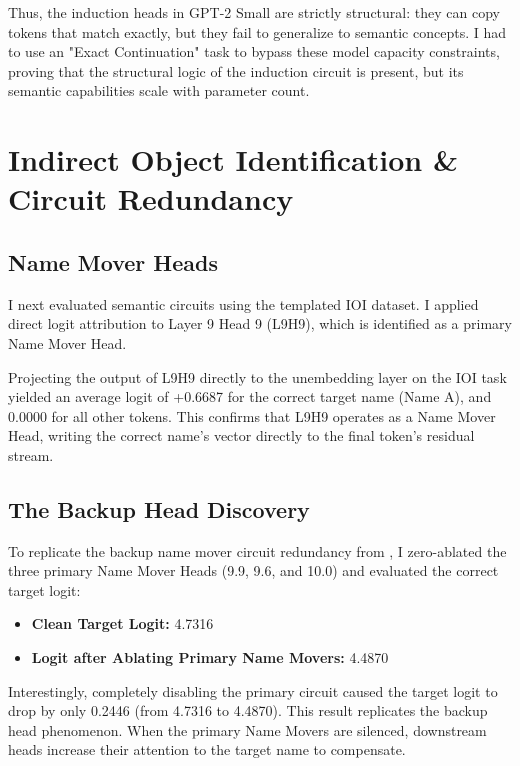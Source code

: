 \documentclass[11pt]{article}
\begin{document}
Thus, the induction heads in GPT-2 Small are strictly structural: they can copy tokens that match exactly, but they fail to generalize to semantic concepts. I had to use an "Exact Continuation" task to bypass these model capacity constraints, proving that the structural logic of the induction circuit is present, but its semantic capabilities scale with parameter count.

\section{Indirect Object Identification \& Circuit Redundancy}

\subsection{Name Mover Heads}

I next evaluated semantic circuits using the templated IOI dataset. I applied direct logit attribution to Layer 9 Head 9 (L9H9), which is identified as a primary Name Mover Head. 

Projecting the output of L9H9 directly to the unembedding layer on the IOI task yielded an average logit of +0.6687 for the correct target name (Name A), and 0.0000 for all other tokens. This confirms that L9H9 operates as a Name Mover Head, writing the correct name's vector directly to the final token's residual stream.

\subsection{The Backup Head Discovery}

To replicate the backup name mover circuit redundancy from \citet{wang2022}, I zero-ablated the three primary Name Mover Heads (9.9, 9.6, and 10.0) and evaluated the correct target logit:
\begin{itemize}
    \item \textbf{Clean Target Logit:} 4.7316
    \item \textbf{Logit after Ablating Primary Name Movers:} 4.4870
\end{itemize}

Interestingly, completely disabling the primary circuit caused the target logit to drop by only 0.2446 (from 4.7316 to 4.4870). This result replicates the backup head phenomenon. When the primary Name Movers are silenced, downstream heads increase their attention to the target name to compensate. 
\end{document}
